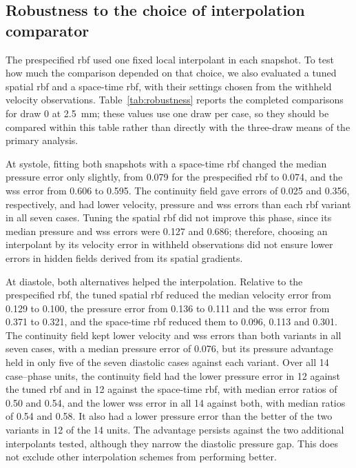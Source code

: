 \documentclass[12pt,a4paper]{article}
\newcommand{\WSS}{\ac{wss}\xspace}
\newcommand{\RBF}{\ac{rbf}\xspace}
\theoremstyle{definition}
\numberwithin{equation}{section}
\begin{document}
\subsection{Robustness to the choice of interpolation comparator}
\label{sec:robustness}
The prespecified \RBF used one fixed local interpolant in each snapshot. To test how much the comparison depended on that choice, we also evaluated a tuned spatial \RBF and a space-time \RBF, with their settings chosen from the withheld velocity observations. Table~\ref{tab:robustness} reports the completed comparisons for draw 0 at 2.5~mm; these values use one draw per case, so they should be compared within this table rather than directly with the three-draw means of the primary analysis.

At systole, fitting both snapshots with a space-time \RBF changed the median pressure error only slightly, from 0.079 for the prespecified \RBF to 0.074, and the \WSS error from 0.606 to 0.595. The continuity field gave errors of 0.025 and 0.356, respectively, and had lower velocity, pressure and \WSS errors than each \RBF variant in all seven cases. Tuning the spatial \RBF did not improve this phase, since its median pressure and \WSS errors were 0.127 and 0.686; therefore, choosing an interpolant by its velocity error in withheld observations did not ensure lower errors in hidden fields derived from its spatial gradients.

At diastole, both alternatives helped the interpolation. Relative to the prespecified \RBF, the tuned spatial \RBF reduced the median velocity error from 0.129 to 0.100, the pressure error from 0.136 to 0.111 and the \WSS error from 0.371 to 0.321, and the space-time \RBF reduced them to 0.096, 0.113 and 0.301. The continuity field kept lower velocity and \WSS errors than both variants in all seven cases, with a median pressure error of 0.076, but its pressure advantage held in only five of the seven diastolic cases against each variant. Over all 14 case--phase units, the continuity field had the lower pressure error in 12 against the tuned \RBF and in 12 against the space-time \RBF, with median error ratios of 0.50 and 0.54, and the lower \WSS error in all 14 against both, with median ratios of 0.54 and 0.58. It also had a lower pressure error than the better of the two variants in 12 of the 14 units. The advantage persists against the two additional interpolants tested, although they narrow the diastolic pressure gap. This does not exclude other interpolation schemes from performing better.
\end{document}
